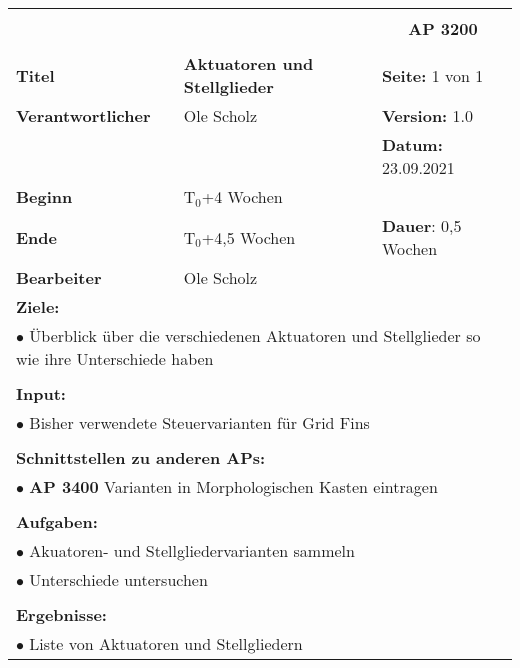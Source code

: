 \clearpage
\begin{table}[!h]
	\begin{center}
		\begin{tabular}{|p{35mm}||p{55mm}|p{50mm}||p{40mm}|}
			\hline
			\multicolumn{3}{|l||}{\textbf{}} & \multicolumn{1}{c|}{}\\
			\multicolumn{3}{|l||}{\textbf{}} & \multicolumn{1}{c|}{\textbf{AP 3200}}\\
			\multicolumn{3}{|l||}{\textbf{}} & \multicolumn{1}{c|}{}\\
			\hline\hline
			\textbf{Titel} & \multicolumn{2}{p{7cm}||}{\textbf{Aktuatoren und Stellglieder}} 
			& \textbf{Seite:} 1 von 1\\
			\hline
			\textbf{Verantwortlicher} & \multicolumn{2}{l||}{Ole Scholz} & \textbf{Version:} 1.0\\
			\hline
			\multicolumn{3}{|l||}{} & \textbf{Datum:} 23.09.2021\\
			\hline\hline
			\textbf{Beginn} & \multicolumn{2}{l||}{T$_0$+4 Wochen} & \\
			\hline
			\textbf{Ende} & \multicolumn{2}{l||}{T$_0$+4,5 Wochen} & \textbf{Dauer}: 0,5 Wochen\\
			\hline\hline
			\textbf{Bearbeiter} & \multicolumn{3}{l|}{Ole Scholz}\\
			\hline\hline
			\multicolumn{4}{|p{150mm}|}{\textbf{Ziele:}}\\
			\multicolumn{4}{|p{150mm}|}{$\bullet$ Überblick über die verschiedenen Aktuatoren und Stellglieder so wie ihre Unterschiede haben}\\
			\multicolumn{4}{|p{150mm}|}{}\\
			\multicolumn{4}{|p{150mm}|}{\textbf{Input:}}\\
			\multicolumn{4}{|p{150mm}|}{$\bullet$ Bisher verwendete Steuervarianten für Grid Fins}\\
			\multicolumn{4}{|p{150mm}|}{}\\
			\multicolumn{4}{|p{150mm}|}{\textbf{Schnittstellen zu anderen APs:}}\\
			\multicolumn{4}{|p{150mm}|}{$\bullet$ \textbf{AP 3400} Varianten in Morphologischen Kasten eintragen}\\
			\multicolumn{4}{|p{150mm}|}{}\\
			\multicolumn{4}{|p{150mm}|}{\textbf{Aufgaben:}}\\
			\multicolumn{4}{|p{150mm}|}{$\bullet$ Akuatoren- und Stellgliedervarianten sammeln}\\
			\multicolumn{4}{|p{150mm}|}{$\bullet$ Unterschiede untersuchen}\\
			\multicolumn{4}{|p{150mm}|}{}\\
			\multicolumn{4}{|p{150mm}|}{\textbf{Ergebnisse:}}\\
			\multicolumn{4}{|p{150mm}|}{$\bullet$ Liste von Aktuatoren und Stellgliedern}\\
			\hline
		\end{tabular}
	\end{center}
\end{table}

